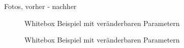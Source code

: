 Fotos, vorher - nachher
\begin{figure}[ht!]
  \centering
  \caption{Whitebox Beispiel mit veränderbaren Parametern}
  \label{fig:whitebox}
\end{figure}

\begin{figure}[ht!]
  \centering
  \caption{Whitebox Beispiel mit veränderbaren Parametern}
  \label{fig:whitebox}
\end{figure}

